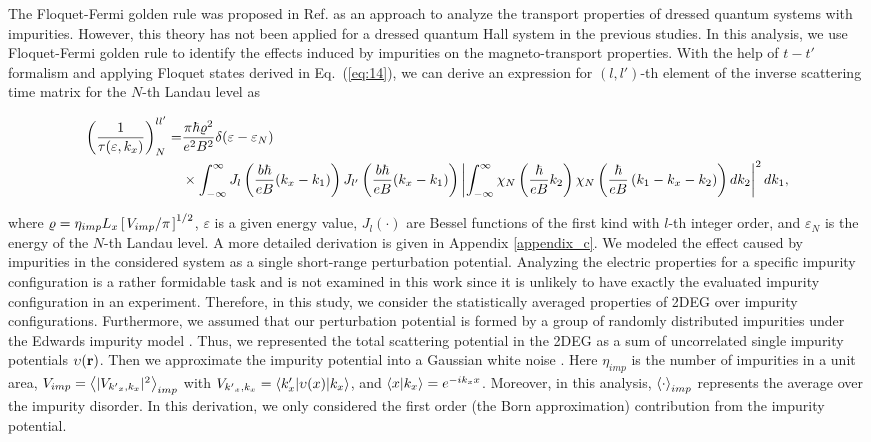 \documentclass[
 reprint,
 amsmath,amssymb,
 aps,
 prb,
]{revtex4-2}
\begin{document}
The Floquet-Fermi golden rule was proposed in Ref. \cite{wackerl20} as an approach to analyze the transport properties of dressed quantum systems with impurities.
However, this theory has not been applied for a dressed quantum Hall system in the previous studies. In this analysis, we use Floquet-Fermi golden rule to identify the effects induced by impurities on the magneto-transport properties.
With the help of $t-t'$ formalism \cite{wackerl20,grifoni98,sambe75,peskin93,althorpe97} and applying Floquet states derived in Eq.~(\ref{eq:14}), we can derive an  expression for $(l,l')$-th element of the inverse scattering time matrix for the $N$-th Landau level as
\begin{widetext}
\begin{equation} \label{eq:15}
  \begin{aligned}
    \left(\frac{1}{\tau(\varepsilon,k_x)}\right)^{ll'}_N = &
    \frac{ \pi \hbar\varrho^2}{e^2B^2} \delta(\varepsilon - \varepsilon_N) \\
    & \times
    \int_{-\infty}^{\infty}
    J_l \bm{\left(} \frac{b\hbar}{eB}({k}_x - k_1) \bm{\right)}
    J_{l'} \bm{\left(} \frac{b\hbar}{eB}({k}_x - k_1) \bm{\right)}
    \left|
    \int_{-\infty}^{\infty}
    \chi_N \left( \frac{\hbar}{eB}k_2 \right)
    \chi_N \bm{\left(} \frac{\hbar}{eB}
    \left( k_1 - {k}_x - k_2 \right) \bm{\right)}
    dk_2 \right|^2 d k_1,
  \end{aligned}
\end{equation}
\end{widetext}
where $\varrho = \eta_{imp} L_x \left[\flatfrac{ V_{imp}}{\pi}\right]^{1/2}$, $\varepsilon$ is a given energy value, $J_l(\cdot)$ are Bessel functions of the first kind with $l$-th integer order, and $\varepsilon_N$ is the energy of the $N$-th Landau level.
A more detailed derivation is given in Appendix \ref{appendix_c}.
{\color{Red}
We modeled the effect caused by impurities in the considered system as a single short-range perturbation potential. Analyzing the electric properties for a specific impurity configuration is a rather formidable task and is not examined in this work since it is unlikely to have exactly the evaluated impurity configuration in an experiment.
Therefore, in this study, we consider the statistically averaged properties of 2DEG over impurity configurations.
Furthermore, we assumed that our perturbation potential is formed by a group of randomly distributed impurities under the Edwards impurity model \cite{akkermans10,wackerl20}.
Thus, we represented the total scattering potential in the 2DEG as a sum of uncorrelated single impurity potentials $\upsilon(\vb{r})$. Then we  approximate the impurity potential into a Gaussian white noise \cite{akkermans10,wackerl20}.
Here $\eta_{imp}$ is the number of impurities in a unit area, $V_{imp} = \expval{|V_{{k'}_x,k_x}|^2}_{imp}$ with $V_{{k'}_x,k_x} = \mel**{k'_x}{\upsilon(x) }{k_x}$, and $\braket{x}{k_x} = e^{-ik_x x}$.
Moreover, in this analysis, $\expval{\cdot}_{imp}$ represents the average over the impurity disorder. In this derivation, we only considered the first order (the Born approximation) contribution from the impurity potential.
}
\end{document}

